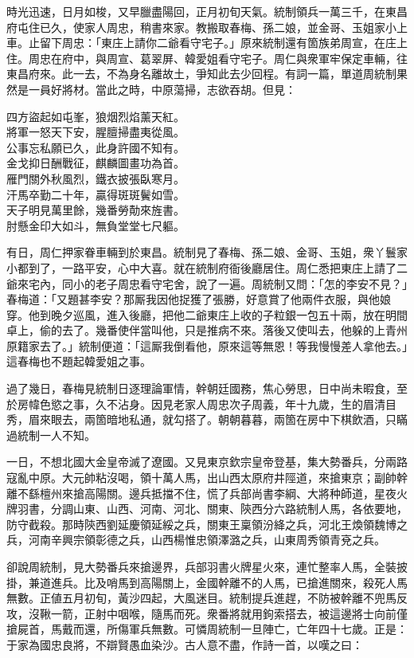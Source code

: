 時光迅速，日月如梭，又早臘盡陽回，正月初旬天氣。統制領兵一萬三千，在東昌府屯住已久，使家人周忠，稍書來家。教搬取春梅、孫二娘，並金哥、玉姐家小上車。止留下周忠：「東庄上請你二爺看守宅子。」原來統制還有箇族弟周宣，在庄上住。周忠在府中，與周宣、葛翠屏、韓愛姐看守宅子。周仁與衆軍牢保定車輛，往東昌府來。此一去，不為身名離故土，爭知此去少回程。有詞一篇，單道周統制果然是一員好將材。當此之時，中原蕩掃，志欲吞胡。但見：

\begin{myquote}
四方盜起如屯峯，狼烟烈焰薰天紅。\\將軍一怒天下安，腥膻掃盡夷從風。\\公事忘私願已久，此身許國不知有。{}\\金戈抑日酬戰征，麒麟圖畫功為首。\\雁門關外秋風烈，鐵衣披張臥寒月。\\汗馬卒勤二十年，贏得斑斑鬢如雪。\\天子明見萬里餘，幾番勞勣來旌書。\\肘懸金印大如斗，無負堂堂七尺軀。
\end{myquote}

有日，周仁押家眷車輛到於東昌。統制見了春梅、孫二娘、金哥、玉姐，衆丫鬟家小都到了，一路平安，心中大喜。就在統制府衙後廳居住。周仁悉把東庄上請了二爺來宅內，同小的老子周忠看守宅舍，說了一遍。周統制又問：「怎的李安不見？」春梅道：「又題甚李安？那厮我因他捉獲了張勝，好意賞了他兩件衣服，與他娘穿。他到晚夕巡風，進入後廳，把他二爺東庄上收的子粒銀一包五十兩，放在明間卓上，偷的去了。幾番使伴當叫他，只是推病不來。落後又使叫去，他躲的上青州原籍家去了。」統制便道：「這厮我倒看他，原來這等無恩！等我慢慢差人拿他去。」這春梅也不題起韓愛姐之事。

過了幾日，春梅見統制日逐理論軍情，幹朝廷國務，焦心勞思，日中尚未暇食，至於房幃色慾之事，久不沾身。因見老家人周忠次子周義，年十九歲，生的眉清目秀，眉來眼去，兩箇暗地私通，就勾搭了。{}朝朝暮暮，兩箇在房中下棋飲酒，只瞞過統制一人不知。

一日，不想北國大金皇帝滅了遼國。又見東京欽宗皇帝登基，集大勢番兵，分兩路寇亂中原。大元帥粘沒喝，領十萬人馬，出山西太原府井陘道，來搶東京；副帥幹離不繇檀州來搶高陽關。邊兵抵擋不住，慌了兵部尚書李綱、大將种師道，星夜火牌羽書，分調山東、山西、河南、河北、關東、陝西分六路統制人馬，各依要地，防守截殺。那時陝西劉延慶領延綏之兵，關東王稟領汾絳之兵，河北王煥領魏博之兵，河南辛興宗領彰德之兵，山西楊惟忠領澤潞之兵，山東周秀領青兗之兵。

卻說周統制，見大勢番兵來搶邊界，兵部羽書火牌星火來，連忙整率人馬，全裝披掛，兼道進兵。比及哨馬到高陽關上，金國幹離不的人馬，已搶進關來，殺死人馬無數。正値五月初旬，黃沙四起，大風迷目。統制提兵進趕，不防被幹離不兜馬反攻，沒鞦一箭，正射中咽喉，隨馬而死。衆番將就用鉤索搭去，被這邊將士向前僅搶屍首，馬戴而還，所傷軍兵無數。可憐周統制一旦陣亡，亡年四十七歲。正是：于家為國忠良將，不辯賢愚血染沙。古人意不盡，作詩一首，以嘆之曰：

